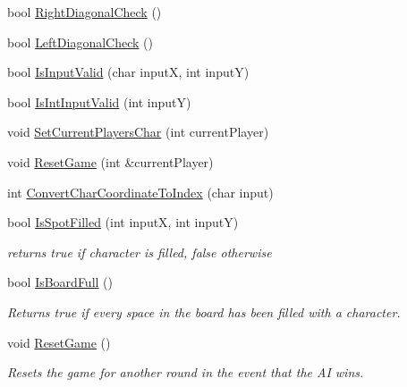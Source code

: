\begin{DoxyCompactItemize}
\item 
bool \hyperlink{classTicTacToe_a3b96d4252e042b2e85bb0bc9a501bc0c}{Right\-Diagonal\-Check} ()
\item 
bool \hyperlink{classTicTacToe_ad65a6d8382d7a59c68a6778caea91d78}{Left\-Diagonal\-Check} ()
\item 
bool \hyperlink{classTicTacToe_a6c8bc2be4b6fc3f462905252c70b5183}{Is\-Input\-Valid} (char input\-X, int input\-Y)
\item 
bool \hyperlink{classTicTacToe_a5182bf8f6a082e22e522b31bdd179df7}{Is\-Int\-Input\-Valid} (int input\-Y)
\item 
void \hyperlink{classTicTacToe_a3c05c5ac2c16a02a6a3c3b2021fdde74}{Set\-Current\-Players\-Char} (int current\-Player)
\item 
void \hyperlink{classTicTacToe_a740fc2c6b0526442ead17835c473f93e}{Reset\-Game} (int \&current\-Player)
\item 
int \hyperlink{classTicTacToe_a40ab96fced3061640200f5e7b83e0415}{Convert\-Char\-Coordinate\-To\-Index} (char input)
\item 
bool \hyperlink{classTicTacToe_a7b1ba09a855c9a3f71e3e06b3e76a992}{Is\-Spot\-Filled} (int input\-X, int input\-Y)
\begin{DoxyCompactList}\small\item\em returns true if character is filled, false otherwise \end{DoxyCompactList}\item 
bool \hyperlink{classTicTacToe_a7bb5521e85c2a1d4c61ab405d03a62c5}{Is\-Board\-Full} ()
\begin{DoxyCompactList}\small\item\em Returns true if every space in the board has been filled with a character. \end{DoxyCompactList}\item 
void \hyperlink{classTicTacToe_a36b58f33246558d0b7b34412b641cff6}{Reset\-Game} ()
\begin{DoxyCompactList}\small\item\em Resets the game for another round in the event that the A\-I wins. \end{DoxyCompactList}\end{DoxyCompactItemize}
